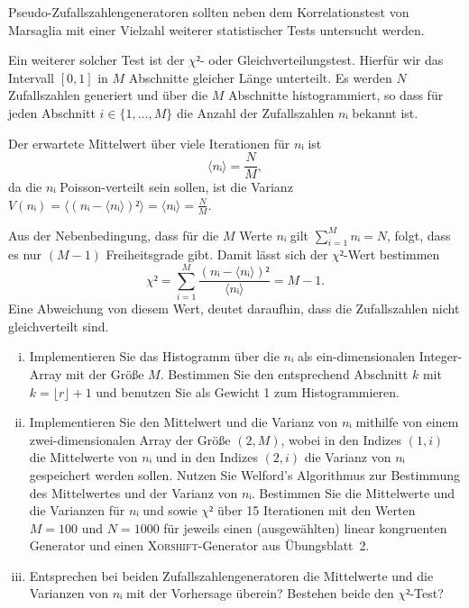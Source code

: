 \begin{question}[subtitle=$χ²$- oder Gleichverteilungstest]
  Pseudo-Zufallszahlengeneratoren sollten neben dem Korrelationstest von Marsaglia mit einer Vielzahl weiterer statistischer Tests untersucht werden.

  Ein weiterer solcher Test ist der $χ²$- oder Gleichverteilungstest.
  Hierfür wir das Intervall $[0, 1]$ in $M$ Abschnitte gleicher Länge unterteilt.
  Es werden $N$ Zufallszahlen generiert und über die $M$ Abschnitte histogrammiert, so dass für jeden Abschnitt $i ∈ \{1, …, M\}$ die Anzahl der Zufallszahlen $nᵢ$ bekannt ist.

  Der erwartete Mittelwert über viele Iterationen für $nᵢ$ ist
  \begin{equation}
    \langle nᵢ \rangle = \frac{N}{M},
  \end{equation}
  da die $nᵢ$ Poisson-verteilt sein sollen, ist die Varianz $V(nᵢ) = \langle (nᵢ - \langle nᵢ \rangle)² \rangle = \langle nᵢ \rangle = \frac{N}{M}$.

  Aus der Nebenbedingung, dass für die $M$ Werte $nᵢ$ gilt $∑_{i = 1}^M nᵢ = N$, folgt, dass es nur $(M - 1)$ Freiheitsgrade gibt.
  Damit lässt sich der $χ²$-Wert bestimmen
  \begin{equation}
    χ² = ∑_{i = 1}^M \frac{(nᵢ - \langle nᵢ \rangle)²}{\langle  nᵢ \rangle} = M - 1.
  \end{equation}
  Eine Abweichung von diesem Wert, deutet daraufhin, dass die Zufallszahlen nicht gleichverteilt sind.

  \begin{enumerate}[(i)]
  \item Implementieren Sie das Histogramm über die $nᵢ$ als ein-dimensionalen Integer-Array mit der Größe $M$.
    Bestimmen Sie den entsprechend Abschnitt $k$ mit $k = \lfloor r \rfloor + 1$ und benutzen Sie als Gewicht \num{1} zum Histogrammieren.
  \item Implementieren Sie den Mittelwert und die Varianz von $nᵢ$ mithilfe von einem zwei-dimensionalen Array der Größe $(2, M)$, wobei in den Indizes $(1, i)$ die Mittelwerte von $nᵢ$ und in den Indizes $(2, i)$ die Varianz von $nᵢ$ gespeichert werden sollen. Nutzen Sie Welford's Algorithmus zur Bestimmung des Mittelwertes und der Varianz von $nᵢ$.
    Bestimmen Sie die Mittelwerte und die Varianzen für $nᵢ$ und sowie $χ²$ über \num{15} Iterationen mit den Werten $M = 100$ und $N = 1000$ für jeweils einen (ausgewählten) linear kongruenten Generator und einen \textsc{Xorshift}-Generator aus Übungsblatt~2.
  \item Entsprechen bei beiden Zufallszahlengeneratoren die Mittelwerte und die Varianzen von $nᵢ$ mit der Vorhersage überein? Bestehen beide den $χ²$-Test?
  \end{enumerate}
  \inputminted{fortran}{../src/aufgabe07.f90}
\end{question}
